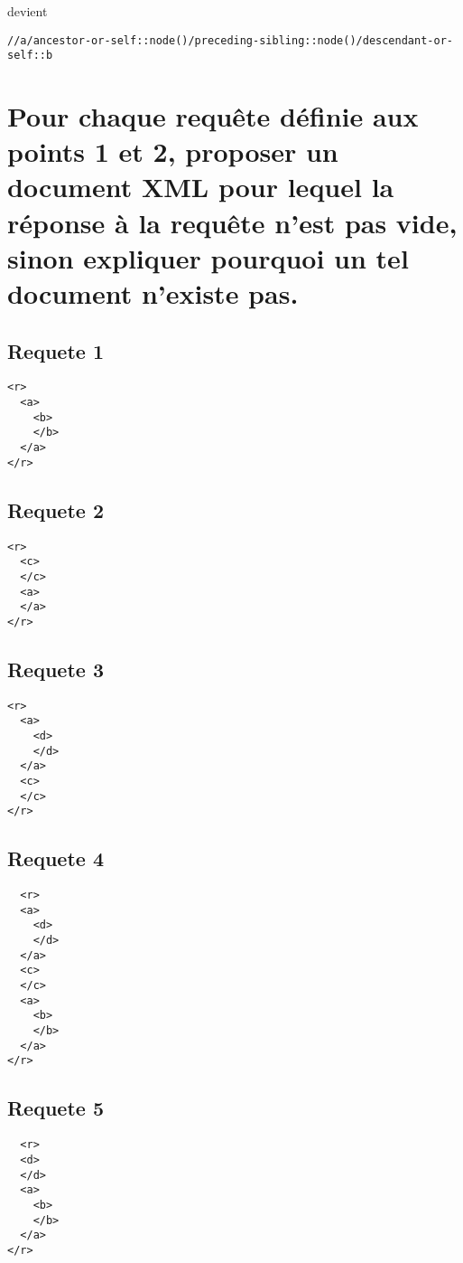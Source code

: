 devient

\begin{verbatim}
//a/ancestor-or-self::node()/preceding-sibling::node()/descendant-or-self::b
\end{verbatim}


\section{Pour chaque requête définie aux points 1 et 2, proposer un document XML pour lequel la réponse à la requête n’est pas vide, sinon expliquer pourquoi un tel document n’existe pas.}
\subsection{Requete 1}
\begin{verbatim}
<r>
  <a>
    <b>
    </b>
  </a>
</r>
\end{verbatim}

\subsection{Requete 2}
\begin{verbatim}
<r>
  <c>
  </c>
  <a>
  </a>
</r>
\end{verbatim}

\subsection{Requete 3}
\begin{verbatim}
<r>
  <a>
    <d>
    </d>
  </a>
  <c>
  </c>
</r>
\end{verbatim}

\subsection{Requete 4}
\begin{verbatim}
  <r>
  <a>
    <d>
    </d>
  </a>
  <c>
  </c>
  <a>
    <b>
    </b>
  </a>
</r>
\end{verbatim}

\subsection{Requete 5}
\begin{verbatim}
  <r>
  <d>
  </d>
  <a>
    <b>
    </b>
  </a>
</r>
\end{verbatim}

